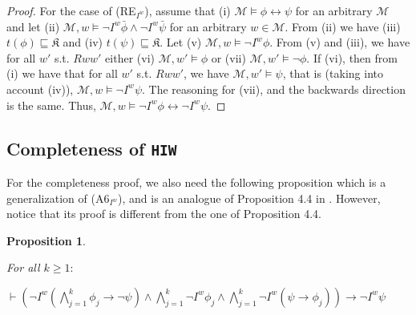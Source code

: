 \documentclass{article}
\newtheorem{prop}{Proposition}
\begin{document}
\begin{proof}
For the case of (RE$_{I^{w}}$), assume that (i) $\mathcal{M} \models \phi \leftrightarrow \psi$ for an arbitrary $\mathcal{M}$ and let (ii) $\mathcal{M}, w \models \neg I^{w} \bar{\phi} \wedge \neg I^{w} \bar{\psi}$ for an arbitrary $w \in \mathcal{M}$. From (ii) we have (iii) $t(\phi) \sqsubseteq \mathfrak{K}$ and (iv) $t(\psi) \sqsubseteq \mathfrak{K}$. Let (v) $\mathcal{M}, w \models \neg I^{w} \phi$. From (v) and (iii), we have  for all $w'$ s.t. $Rww'$ either (vi) $\mathcal{M}, w' \models \phi$ or (vii) $\mathcal{M}, w' \models \neg \phi$. If (vi), then from (i) we have that for all $w'$ s.t. $Rww'$, we have $\mathcal{M}, w' \models \psi$, that is (taking into account (iv)), $\mathcal{M}, w \models \neg I^{w} \psi$. The reasoning for (vii), and the backwards direction is the same. Thus, $\mathcal{M}, w \models \neg I^{w} \phi \leftrightarrow \neg I^{w} \psi$.



\end{proof}

\subsection{Completeness of \texttt{HIW}}
\label{appHIWcomplete}

For the completeness proof, we also need the following proposition which is a generalization of (A6$_{I^{w}}$), and is an analogue of Proposition 4.4 in \citep{Fan2015}. However, notice that its proof is different from the one of Proposition 4.4.


\begin{prop}
\label{genA6IW}

For all $k \geq 1:$

\begin{center}

$\vdash (\neg I^{w} (\bigwedge^{k}_{j=1} \phi_{j} \rightarrow \neg \psi) \wedge \bigwedge^{k}_{j=1} \neg I^{w} \phi_{j} \wedge \bigwedge^{k}_{j=1} \neg I^{w}(\psi \rightarrow \phi_{j})) \rightarrow \neg I^{w} \psi$

\end{center}

\end{prop}
\end{document}
